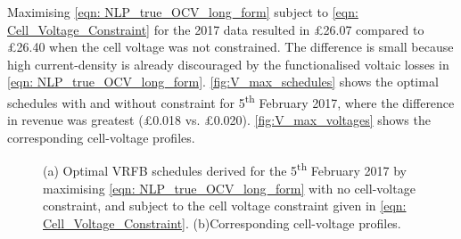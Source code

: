 \documentclass[preprint,3p,review,authoryear,10pt]{elsarticle}
\begin{document}
Maximising \cref{eqn: NLP_true_OCV_long_form} subject to \cref{eqn: Cell_Voltage_Constraint} for the 2017 data resulted in \pounds 26.07 compared to \pounds 26.40 when the cell voltage was not constrained. The difference is small because high current-density is already discouraged by the functionalised voltaic losses in \cref{eqn: NLP_true_OCV_long_form}. \cref{fig:V_max_schedules} shows the optimal schedules with and without constraint for 5\textsuperscript{th} February 2017, where the difference in revenue was greatest (\pounds 0.018 vs. \pounds 0.020). \cref{fig:V_max_voltages} shows the corresponding cell-voltage profiles.

\begin{figure}[!ht]
\centering
{}
\caption{(a) Optimal VRFB schedules derived for the 5\textsuperscript{th} February 2017 by maximising \cref{eqn: NLP_true_OCV_long_form} with no cell-voltage constraint, and subject to the cell voltage constraint given in \cref{eqn: Cell_Voltage_Constraint}. (b)Corresponding cell-voltage profiles.}
\end{figure}
\end{document}
